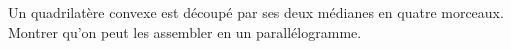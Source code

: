 Un quadrilatère convexe est découpé par ses deux médianes en quatre morceaux. Montrer qu'on peut les assembler en un parallélogramme.
